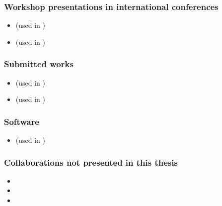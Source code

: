 \subsubsection*{Workshop presentations in international conferences}

\begin{itemize}
	\item {} (used in )
	\item {} (used in )
\end{itemize}

\subsubsection*{Submitted works}

\begin{itemize}
	\item {} (used in )
	\item {} (used in )
\end{itemize}

\subsubsection*{Software}

\begin{itemize}
	\item {} (used in )
\end{itemize}

\subsubsection*{Collaborations not presented in this thesis}

\begin{itemize}
	\item {}
	\item {}
	\item {}
\end{itemize}